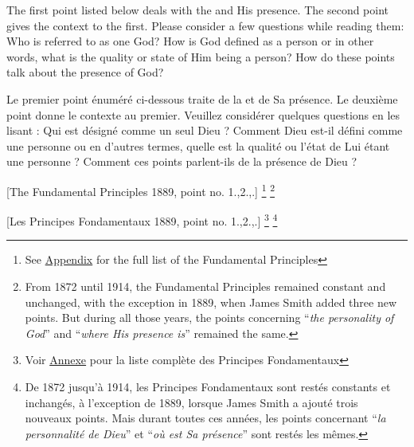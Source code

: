 The first point listed below deals with the  and His presence. The second point gives the context to the first. Please consider a few questions while reading them: Who is referred to as one God? How is God defined as a person or in other words, what is the quality or state of Him being a person? How do these points talk about the presence of God?


Le premier point énuméré ci-dessous traite de la  et de Sa présence. Le deuxième point donne le contexte au premier. Veuillez considérer quelques questions en les lisant : Qui est désigné comme un seul Dieu ? Comment Dieu est-il défini comme une personne ou en d'autres termes, quelle est la qualité ou l'état de Lui étant une personne ? Comment ces points parlent-ils de la présence de Dieu ?






[The Fundamental Principles 1889, point no. 1.,2.,.] \footnote{See \hyperref[chap:appendix]{Appendix} for the full list of the Fundamental Principles} \footnote{From 1872 until 1914, the Fundamental Principles remained constant and unchanged, with the exception in 1889, when James Smith added three new points. But during all those years, the points concerning “\textit{the personality of God}” and “\textit{where His presence is}” remained the same. }


[Les Principes Fondamentaux 1889, point no. 1.,2.,.] \footnote{Voir \hyperref[chap:appendix]{Annexe} pour la liste complète des Principes Fondamentaux} \footnote{De 1872 jusqu'à 1914, les Principes Fondamentaux sont restés constants et inchangés, à l'exception de 1889, lorsque James Smith a ajouté trois nouveaux points. Mais durant toutes ces années, les points concernant “\textit{la personnalité de Dieu}” et “\textit{où est Sa présence}” sont restés les mêmes. }


